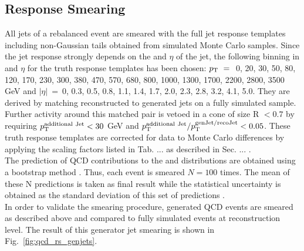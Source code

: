 \subsection{Response Smearing}
\label{subsec:RA2_smear}
All jets of a rebalanced event are smeared with the full jet response templates including non-Gaussian tails obtained from simulated Monte Carlo samples. Since the jet response strongly depends on the \pt and $\eta$ of the jet, the following binning in \pt and $\eta$ for the truth response templates has been chosen: $p_{\text{T}}~=~$ 0, 20, 30, 50, 80, 120, 170, 230, 300, 380, 470, 570, 680, 800, 1000, 1300, 1700, 2200, 2800, 3500 GeV and $|\eta|~=~$0, 0.3, 0.5, 0.8, 1.1, 1.4, 1.7, 2.0, 2.3, 2.8, 3.2, 4.1, 5.0. They are derived by matching reconstructed to generated jets on a fully simulated sample. Further activity around this matched pair is vetoed in a cone of size R $< 0.7$ by requiring $p_{\text{T}}^{\rm{additional~Jet}} < 30$ GeV and $p_{\text{T}}^{\rm{additional~Jet}}/p_{\text{T}}^{\rm{genJet/recoJet}} < 0.05$. These truth response templates are corrected for data to Monte Carlo differences by applying the scaling factors listed in Tab. ... as described in Sec. ... . \\
The prediction of QCD contributions to the \HT and \MHT distributions are obtained using a bootstrap method . Thus, each event is smeared $N = 100$ times. The mean of these N predictions is taken as final result while the statistical uncertainty is obtained as the standard deviation of this set of predictions .\\
In order to validate the smearing procedure, generated QCD events are smeared as described above and compared to fully simulated events at reconstruction level. The result of this generator jet smearing is shown in Fig.~\ref{fig:qcd_rs_genjets}. \\

